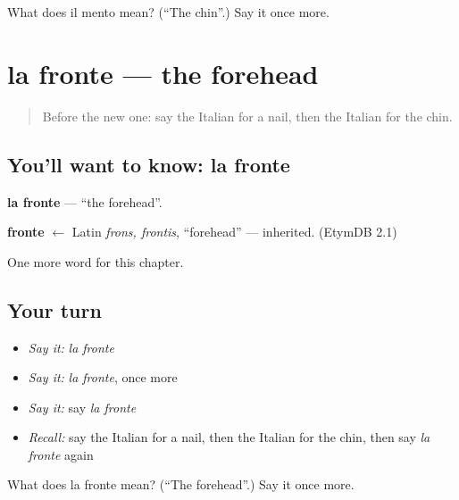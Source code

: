 \begin{tcolorbox}[breakable,colback=teal!4,colframe=teal!35!black,title={Before you move on}]
What does il mento mean? (\textquotedblleft{}The chin\textquotedblright{}.) Say it once more.
\end{tcolorbox}
\section[la fronte]{la fronte — the forehead}

\label{lesson:IT-C40-fronte}



\begin{quote}
Before the new one: say the Italian for a nail, then the Italian for the chin.
\end{quote}

\subsection*{You'll want to know: la fronte}
\textbf{la fronte} — \textquotedblleft{}the forehead\textquotedblright{}.

\begin{cousinweb}
\textbf{fronte} $\leftarrow$ Latin \emph{frons, frontis}, \textquotedblleft{}forehead\textquotedblright{} — inherited. (EtymDB 2.1)
\end{cousinweb}

\begin{grammarlens}[title={What you've built}]
One more word for this chapter.
\end{grammarlens}

\subsection*{Your turn}
\begin{itemize}
\raggedright
  \item \emph{Say it:} \emph{la fronte}
  \item \emph{Say it:} \emph{la fronte}, once more
  \item \emph{Say it:} say \emph{la fronte}
  \item \emph{Recall:} say the Italian for a nail, then the Italian for the chin, then say \emph{la fronte} again
\end{itemize}

\begin{tcolorbox}[breakable,colback=teal!4,colframe=teal!35!black,title={Before you move on}]
What does la fronte mean? (\textquotedblleft{}The forehead\textquotedblright{}.) Say it once more.
\end{tcolorbox}
